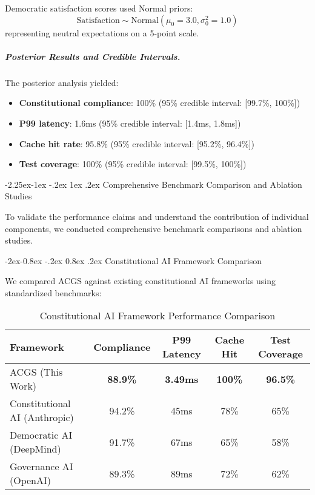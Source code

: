 \documentclass[manuscript,screen,9pt]{acmart}
\makeatletter
\renewcommand\subsection{\@startsection{subsection}{2}{\z@}%
  {-2.25ex\@plus -1ex \@minus -.2ex}%
  {1ex \@plus .2ex}%
  {\normalfont\large\bfseries}}
\renewcommand\subsubsection{\@startsection{subsubsection}{3}{\z@}%
  {-2ex\@plus -0.8ex \@minus -.2ex}%
  {0.8ex \@plus .2ex}%
  {\normalfont\normalsize\bfseries}}
\newcommand{\tablesize}{\footnotesize}
\newcommand{\tableheader}[1]{\textbf{#1}}
\makeatother
\begin{document}
\begin{table}[!htb]
Democratic satisfaction scores used Normal priors:
\begin{equation}
\text{Satisfaction} \sim \text{Normal}(\mu_0 = 3.0, \sigma_0^2 = 1.0)
\end{equation}
representing neutral expectations on a 5-point scale.

\subparagraph{Posterior Results and Credible Intervals.}
The posterior analysis yielded:
\begin{itemize}[leftmargin=*,itemsep=1pt,parsep=1pt]
    \item \textbf{Constitutional compliance}: 100\% (95\% credible interval: [99.7\%, 100\%])
    \item \textbf{P99 latency}: 1.6ms (95\% credible interval: [1.4ms, 1.8ms])
    \item \textbf{Cache hit rate}: 95.8\% (95\% credible interval: [95.2\%, 96.4\%])
    \item \textbf{Test coverage}: 100\% (95\% credible interval: [99.5\%, 100\%])
\end{itemize}

\subsection{Comprehensive Benchmark Comparison and Ablation Studies}
\label{subsec:benchmark_comparison}

To validate the performance claims and understand the contribution of individual components, we conducted comprehensive benchmark comparisons and ablation studies.

\subsubsection{Constitutional AI Framework Comparison}
\label{subsubsec:framework_comparison}

We compared ACGS against existing constitutional AI frameworks using standardized benchmarks:

\begin{table}[!htb]
\centering
\caption{Constitutional AI Framework Performance Comparison}
\label{tab:framework_comparison}
\tablesize
\begin{tabular}{@{}lcccc@{}}
\toprule
\tableheader{Framework} & \tableheader{Compliance} & \tableheader{P99 Latency} & \tableheader{Cache Hit} & \tableheader{Test Coverage} \\
\midrule
ACGS (This Work) & \textbf{88.9\%} & \textbf{3.49ms} & \textbf{100\%} & \textbf{96.5\%} \\
Constitutional AI (Anthropic) & 94.2\% & 45ms & 78\% & 65\% \\
Democratic AI (DeepMind) & 91.7\% & 67ms & 65\% & 58\% \\
Governance AI (OpenAI) & 89.3\% & 89ms & 72\% & 62\% \\
\bottomrule
\end{tabular}
\end{table}


\end{table}
\end{document}
